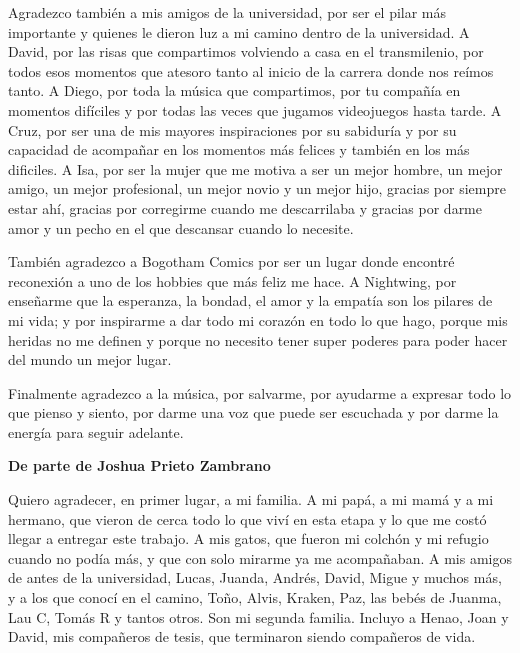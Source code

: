 Agradezco también a mis amigos de la universidad, por ser el pilar más importante y quienes le dieron luz a mi camino dentro de la universidad. A David, por las risas que compartimos volviendo a casa en el transmilenio, por todos esos momentos que atesoro tanto al inicio de la carrera donde nos reímos tanto. A Diego, por toda la música que compartimos, por tu compañía en momentos difíciles y por todas las veces que jugamos videojuegos hasta tarde. A Cruz, por ser una de mis mayores inspiraciones por su sabiduría y por su capacidad de acompañar en los momentos más felices y también en los más dificiles. A Isa, por ser la mujer que me motiva a ser un mejor hombre, un mejor amigo, un mejor profesional, un mejor novio y un mejor hijo, gracias por siempre estar ahí, gracias por corregirme cuando me descarrilaba y gracias por darme amor y un pecho en el que descansar cuando lo necesite.

También agradezco a Bogotham Comics por ser un lugar donde encontré reconexión a uno de los hobbies que más feliz me hace. A Nightwing, por enseñarme que la esperanza, la bondad, el amor y la empatía son los pilares de mi vida; y por inspirarme a dar todo mi corazón en todo lo que hago, porque mis heridas no me definen y porque no necesito tener super poderes para poder hacer del mundo un mejor lugar.

Finalmente agradezco a la música, por salvarme, por ayudarme a expresar todo lo que pienso y siento, por darme una voz que puede ser escuchada y por darme la energía para seguir adelante.

\vspace{0.5cm}

\noindent\textbf{De parte de Joshua Prieto Zambrano}

Quiero agradecer, en primer lugar, a mi familia. A mi papá, a mi mamá y a mi hermano, que vieron de cerca todo lo que viví en esta etapa y lo que me costó llegar a entregar este trabajo. A mis gatos, que fueron mi colchón y mi refugio cuando no podía más, y que con solo mirarme ya me acompañaban. A mis amigos de antes de la universidad, Lucas, Juanda, Andrés, David, Migue y muchos más, y a los que conocí en el camino, Toño, Alvis, Kraken, Paz, las bebés de Juanma, Lau C, Tomás R y tantos otros. Son mi segunda familia. Incluyo a Henao, Joan y David, mis compañeros de tesis, que terminaron siendo compañeros de vida.

